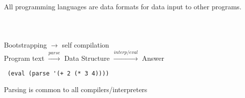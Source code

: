 \documentclass{article}
\newcommand\tab[1][1cm]{\hspace*{#1}}
\begin{document}
\begin{flushleft}
\begin{flushleft}
\begin{flushleft}
\begin{verbatim}
\end{verbatim}
\end{flushleft}
\begin{flushleft}
All programming languages are data formats for data input to other programs.\\
\bigskip
{}\\
\hspace{0.6cm}\tab{}\\
\hspace{3cm}\\
\vspace*{0.6cm}
\hspace{0.3cm}Bootstrapping $\rightarrow$ self compilation
\vspace*{1cm}\\
Program text $\xrightarrow{parse}$ Data Structure $\xrightarrow{interp/eval}$ Answer\\
\end{flushleft}
\begin{verbatim}
 (eval (parse '(+ 2 (* 3 4))))
\end{verbatim}
Parsing is common to all compilers/interpreters
\end{flushleft}
\end{flushleft}
\end{document}
